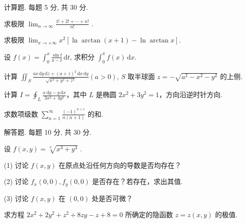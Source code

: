 \par{}
计算题. 每题 5 分, 共 30 分.\par
求极限  $\lim_{n\to\infty}\frac{1!+2!+\cdots+n!}{n!}$ .\par
求极限 $\lim_{x\to +\infty}x^2 [\ln \arctan (x + 1) - \ln \arctan x]$.\par
设 $f(x) = \int_{0}^{x} \frac{\sin t}{\pi - t} \, \mathrm{d}t$, 求积分 $\int_{0}^{\pi} f(x) \, \mathrm{d}x$.\par
计算 $\iint_{S} \frac{ax \, \mathrm{d}y \, \mathrm{d}z + (a + z)^2 \, \mathrm{d}x \, \mathrm{d}y}{\sqrt{x^2 + y^2 + z^2}} (a > 0)$, $S$ 取半球面 $z = -\sqrt{a^2 - x^2 - y^2}$ 的上侧.\par
计算 $I = \oint_{L} \frac{x \, \mathrm{d}y - y \, \mathrm{d}x}{3x^2 + 4y^2}$，其中 $L$ 是椭圆 $2x^2 + 3y^2 = 1$，方向沿逆时针方向.\par
求数项级数 $\sum_{n=1}^{\infty} \frac{(-1)^{n+1}}{n(n+1)}$ 的和.\par
\par{}
解答题. 每题 10 分, 共 30 分.\par
设  $f(x,y)=\sqrt[3]{x^{3}+y^{3}}$ .\par
(1) 讨论 $f(x, y)$ 在原点处沿任何方向的导数是否均存在？\par
(2) 讨论 $f_{x}(0,0), f_{y}(0,0)$ 是否存在？若存在，求出其值.\par
(3) 讨论 $f(x, y)$ 在 $(0, 0)$ 处是否可微？\par
求方程 $2x^{2} + 2y^{2} + z^{2} + 8zy - z + 8 = 0$ 所确定的隐函数 $z = z(x, y)$ 的极值.\par
